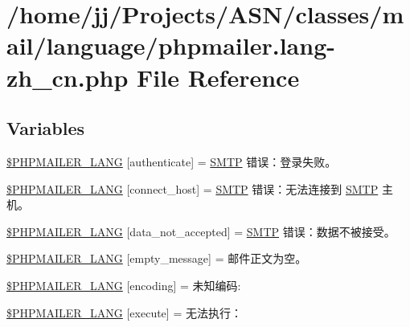 \hypertarget{phpmailer_8lang-zh__cn_8php}{}\section{/home/jj/\+Projects/\+A\+S\+N/classes/mail/language/phpmailer.lang-\/zh\+\_\+cn.php File Reference}
\label{phpmailer_8lang-zh__cn_8php}
\subsection*{Variables}
\begin{DoxyCompactItemize}
\item 
\hyperlink{phpmailer_8lang-zh__cn_8php_a2cb33073c989b85580748e331ed8b4aa}{\$\+P\+H\+P\+M\+A\+I\+L\+E\+R\+\_\+\+L\+A\+NG} \mbox{[}\textquotesingle{}authenticate\textquotesingle{}\mbox{]} = \textquotesingle{}\hyperlink{class_s_m_t_p}{S\+M\+TP} 错误：登录失败。\textquotesingle{}
\item 
\hyperlink{phpmailer_8lang-zh__cn_8php_a2ee0cc637a06b96e45600db31c6799ee}{\$\+P\+H\+P\+M\+A\+I\+L\+E\+R\+\_\+\+L\+A\+NG} \mbox{[}\textquotesingle{}connect\+\_\+host\textquotesingle{}\mbox{]} = \textquotesingle{}\hyperlink{class_s_m_t_p}{S\+M\+TP} 错误：无法连接到 \hyperlink{class_s_m_t_p}{S\+M\+TP} 主机。\textquotesingle{}
\item 
\hyperlink{phpmailer_8lang-zh__cn_8php_a814c6b191205d2361b3233e9c9d6fda5}{\$\+P\+H\+P\+M\+A\+I\+L\+E\+R\+\_\+\+L\+A\+NG} \mbox{[}\textquotesingle{}data\+\_\+not\+\_\+accepted\textquotesingle{}\mbox{]} = \textquotesingle{}\hyperlink{class_s_m_t_p}{S\+M\+TP} 错误：数据不被接受。\textquotesingle{}
\item 
\hyperlink{phpmailer_8lang-zh__cn_8php_a33772099f637c9d6c2cd7425e0e37fed}{\$\+P\+H\+P\+M\+A\+I\+L\+E\+R\+\_\+\+L\+A\+NG} \mbox{[}\textquotesingle{}empty\+\_\+message\textquotesingle{}\mbox{]} = \textquotesingle{}邮件正文为空。\textquotesingle{}
\item 
\hyperlink{phpmailer_8lang-zh__cn_8php_a817f7283f3d54c970a0c10305cc668cc}{\$\+P\+H\+P\+M\+A\+I\+L\+E\+R\+\_\+\+L\+A\+NG} \mbox{[}\textquotesingle{}encoding\textquotesingle{}\mbox{]} = \textquotesingle{}未知编码\+: \textquotesingle{}
\item 
\hyperlink{phpmailer_8lang-zh__cn_8php_a668217a9563a168f30f2a8548b6ed5a9}{\$\+P\+H\+P\+M\+A\+I\+L\+E\+R\+\_\+\+L\+A\+NG} \mbox{[}\textquotesingle{}execute\textquotesingle{}\mbox{]} = \textquotesingle{}无法执行：\textquotesingle{}

\end{DoxyCompactItemize}
